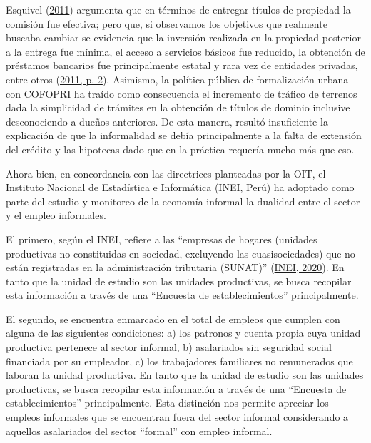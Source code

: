 \documentclass[
  letterpaper,
  12pt,
  oneside,
  spanish,
  doublespacing,
  headsepline,
  parskip]{MastersDoctoralThesis}
\begin{document}
Esquivel (\protect\hyperlink{ref-esquivel2011}{2011}) argumenta que en
términos de entregar títulos de propiedad la comisión fue efectiva; pero
que, si observamos los objetivos que realmente buscaba cambiar se
evidencia que la inversión realizada en la propiedad posterior a la
entrega fue mínima, el acceso a servicios básicos fue reducido, la
obtención de préstamos bancarios fue principalmente estatal y rara vez
de entidades privadas, entre otros
(\protect\hyperlink{ref-esquivel2011}{2011, p. 2}). Asimismo, la
política pública de formalización urbana con COFOPRI ha traído como
consecuencia el incremento de tráfico de terrenos dada la simplicidad de
trámites en la obtención de títulos de dominio inclusive desconociendo a
dueños anteriores. De esta manera, resultó insuficiente la explicación
de que la informalidad se debía principalmente a la falta de extensión
del crédito y las hipotecas dado que en la práctica requería mucho más
que eso.

Ahora bien, en concordancia con las directrices planteadas por la OIT,
el Instituto Nacional de Estadística e Informática (INEI, Perú) ha
adoptado como parte del estudio y monitoreo de la economía informal la
dualidad entre el sector y el empleo informales.

El primero, según el INEI, refiere a las ``empresas de hogares (unidades
productivas no constituidas en sociedad, excluyendo las cuasisociedades)
que no están registradas en la administración tributaria (SUNAT)''
(\protect\hyperlink{ref-inei2020}{INEI, 2020}). En tanto que la unidad
de estudio son las unidades productivas, se busca recopilar esta
información a través de una ``Encuesta de establecimientos''
principalmente.

El segundo, se encuentra enmarcado en el total de empleos que cumplen
con alguna de las siguientes condiciones: a) los patronos y cuenta
propia cuya unidad productiva pertenece al sector informal, b)
asalariados sin seguridad social financiada por su empleador, c) los
trabajadores familiares no remunerados que laboran la unidad productiva.
En tanto que la unidad de estudio son las unidades productivas, se busca
recopilar esta información a través de una ``Encuesta de
establecimientos'' principalmente. Esta distinción nos permite apreciar
los empleos informales que se encuentran fuera del sector informal
considerando a aquellos asalariados del sector ``formal'' con empleo
informal.
\end{document}
